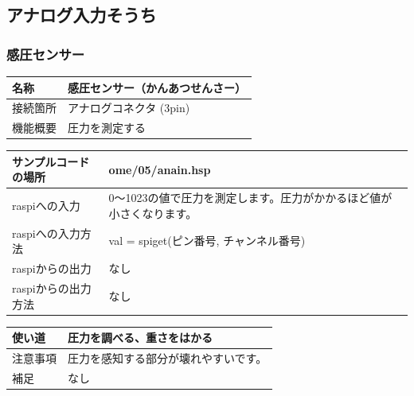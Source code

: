 \subsection{アナログ入力そうち}\label{analog_in}
\subsubsection{感圧センサー}\label{touch}
\begin{table}[H]
	\begin{tabular}{|p{\colF}|p{\colG}|}	\hline
	名称 & 感圧センサー（かんあつせんさー）\\ \hline
	接続箇所 & アナログコネクタ (3pin)\\ \hline
	機能概要 & 圧力を測定する\\ \hline
  \end{tabular}
\end{table}

\begin{table}[H]
	\begin{tabular}{|p{\colF}|p{\colG}|}	\hline
	サンプルコードの場所 & ome/05/anain.hsp\\ \hline
	raspiへの入力 & 0～1023の値で圧力を測定します。圧力がかかるほど値が小さくなります。\\ \hline
	raspiへの入力方法 & val = spiget(ピン番号, チャンネル番号)\\ \hline
	raspiからの出力 & なし\\ \hline
	raspiからの出力方法 & なし\\ \hline
  \end{tabular}
\end{table}

\begin{table}[H]
	\begin{tabular}{|p{\colF}|p{\colG}|} \hline
	使い道 & 圧力を調べる、重さをはかる\\ \hline
	注意事項 & 圧力を感知する部分が壊れやすいです。\\ \hline
	補足 & なし\\ \hline
  \end{tabular}
\end{table}

